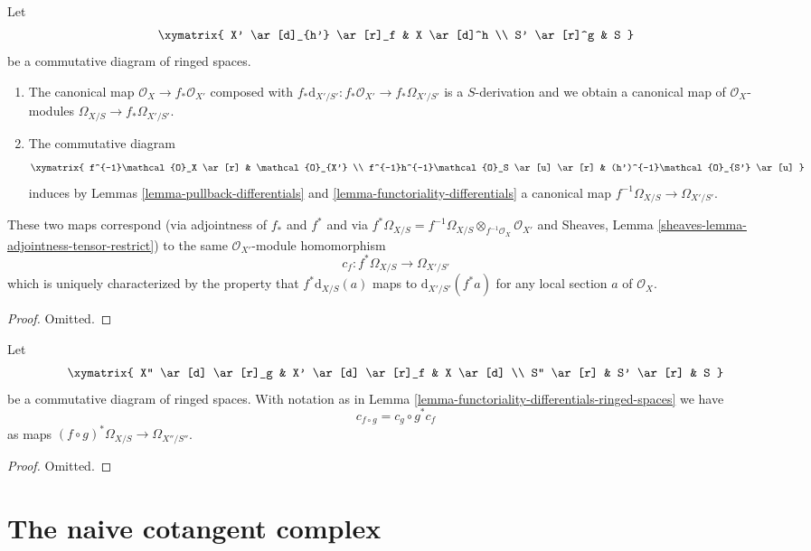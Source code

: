 \begin{lemma}
\label{lemma-functoriality-differentials-ringed-spaces}
Let
$$
\xymatrix{
X' \ar[d]_{h'} \ar[r]_f & X \ar[d]^h \\
S' \ar[r]^g & S
}
$$
be a commutative diagram of ringed spaces.
\begin{enumerate}
\item The canonical map $\mathcal{O}_X \to f_*\mathcal{O}_{X'}$ composed with
$f_*\text{d}_{X'/S'} : f_*\mathcal{O}_{X'} \to f_*\Omega_{X'/S'}$ is a
$S$-derivation and we obtain a canonical map of $\mathcal{O}_X$-modules
$\Omega_{X/S} \to f_*\Omega_{X'/S'}$.
\item The commutative diagram
$$
\xymatrix{
f^{-1}\mathcal{O}_X \ar[r] & \mathcal{O}_{X'} \\
f^{-1}h^{-1}\mathcal{O}_S \ar[u] \ar[r] & (h')^{-1}\mathcal{O}_{S'} \ar[u]
}
$$
induces by Lemmas \ref{lemma-pullback-differentials} and
\ref{lemma-functoriality-differentials}
a canonical map $f^{-1}\Omega_{X/S} \to \Omega_{X'/S'}$.
\end{enumerate}
These two maps correspond (via adjointness of $f_*$ and $f^*$ and
via $f^*\Omega_{X/S} =
f^{-1}\Omega_{X/S} \otimes_{f^{-1}\mathcal{O}_X} \mathcal{O}_{X'}$ and
Sheaves, Lemma \ref{sheaves-lemma-adjointness-tensor-restrict})
to the same $\mathcal{O}_{X'}$-module homomorphism
$$
c_f : f^*\Omega_{X/S} \longrightarrow \Omega_{X'/S'}
$$
which is uniquely characterized by the property that
$f^*\text{d}_{X/S}(a)$ maps to $\text{d}_{X'/S'}(f^*a)$
for any local section $a$ of $\mathcal{O}_X$.
\end{lemma}

\begin{proof}
Omitted.
\end{proof}

\begin{lemma}
\label{lemma-check-functoriality-differentials}
Let
$$
\xymatrix{
X'' \ar[d] \ar[r]_g & X' \ar[d] \ar[r]_f & X \ar[d] \\
S'' \ar[r] & S' \ar[r] & S
}
$$
be a commutative diagram of ringed spaces. With notation as in
Lemma \ref{lemma-functoriality-differentials-ringed-spaces} we have
$$
c_{f \circ g} = c_g \circ g^* c_f
$$
as maps $(f \circ g)^*\Omega_{X/S} \to \Omega_{X''/S''}$.
\end{lemma}

\begin{proof}
Omitted.
\end{proof}


\section{The naive cotangent complex}
\label{section-netherlander}

